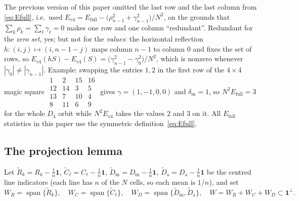 \begin{remark}
\label{rem:v4_not_invariant}
The previous version of this paper omitted the last row and the last column from \eqref{eq:Efull},
i.e.\ used $E_{v4}=E_{\mathrm{full}}-\bigl(\rho_{n-1}^{2}+\gamma_{n-1}^{2}\bigr)/N^{2}$, on the grounds
that $\sum_k\rho_k=\sum_\ell\gamma_\ell=0$ makes one row and one column ``redundant''.  Redundant for the
\emph{zero set}, yes; but not for the \emph{values}: the horizontal reflection $h:(i,j)\mapsto(i,n-1-j)$
maps column $n-1$ to column $0$ and fixes the set of rows, so
$E_{v4}(hS)-E_{v4}(S)=\bigl(\gamma_{n-1}^{2}-\gamma_{0}^{2}\bigr)/N^{2}$, which is nonzero
whenever $|\gamma_0|\ne|\gamma_{n-1}|$.  Example: swapping the entries $1,2$ in the first row of the
$4\times4$ magic square $\begin{smallmatrix}1&2&15&16\\12&14&3&5\\13&7&10&4\\8&11&6&9\end{smallmatrix}$
gives $\gamma=(1,-1,0,0)$ and $\delta_{\mathrm m}=1$, so $N^{2}E_{\mathrm{full}}=3$ for the whole $D_4$ orbit while $N^{2}E_{v4}$ takes the
values $2$ and $3$ on it.  All $E_{\mathrm{full}}$ statistics in this paper use the symmetric
definition~\eqref{eq:Efull}.
\end{remark}

\subsection{The projection lemma}
\label{sec:theory_projection}

Let $\tilde R_k=R_k-\frac1n\mathbf 1$, $\tilde C_\ell=C_\ell-\frac1n\mathbf 1$,
$\tilde D_{\mathrm m}=D_{\mathrm m}-\frac1n\mathbf 1$, $\tilde D_{\mathrm a}=D_{\mathrm a}-\frac1n\mathbf 1$
be the centred line indicators (each line has $n$ of the $N$ cells, so each mean is $1/n$), and set
\[
W_R=\operatorname{span}\{\tilde R_k\},\quad W_C=\operatorname{span}\{\tilde C_\ell\},\quad
W_D=\operatorname{span}\{\tilde D_{\mathrm m},\tilde D_{\mathrm a}\},\quad
W=W_R+W_C+W_D\subset\mathbf 1^{\perp}.
\]

